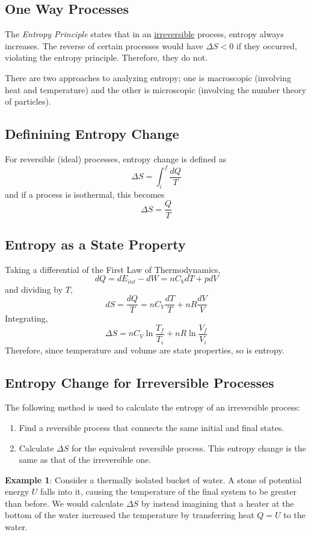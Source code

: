 \documentclass[../PhysicsFormulae.tex]{subfiles}
\begin{document}
\subsection{One Way Processes}
The \textit{Entropy Principle} states that in an \underline{irreversible} process, entropy always increases. The reverse of certain processes would have $\Delta S < 0$ if they occurred, violating the entropy principle. Therefore, they do not. \bigskip

There are two approaches to analyzing entropy; one is macroscopic (involving heat and temperature) and the other is microscopic (involving the number theory of particles). 

\subsection{Definining Entropy Change}
For reversible (ideal) processes, entropy change is defined as 
\[ \Delta S = \int_i^f \frac{dQ}{T} \]
and if a process is isothermal, this becomes
\[ \Delta S = \frac{Q}{T} \]

\subsection{Entropy as a State Property}
Taking a differential of the First Law of Thermodynamics, 
\[ dQ = dE_{int} - dW = n C_V dT + p dV \]
and dividing by $T$, 
\[ dS = \frac{dQ}{T} = n C_V \frac{dT}{T} + n R \frac{dV}{V} \] 
Integrating, 
\[ \Delta S = n C_V \ln{\frac{T_f}{T_i}} + n R \ln{\frac{V_f}{V_i}}  \]
Therefore, since temperature and volume are state properties, so is entropy.

\subsection{Entropy Change for Irreversible Processes}
The following method is used to calculate the entropy of an irreversible process: 
\begin{enumerate}
	\item Find a reversible process that connects the same initial and final states. 
	\item Calculate $\Delta S$ for the equivalent reversible process. This entropy change is the same as that of the irreversible one. 
\end{enumerate}
\textbf{Example 1}: Consider a thermally isolated bucket of water. A stone of potential energy $U$ falls into it, causing the temperature of the final system to be greater than before. We would calculate $\Delta S$ by instead imagining that a heater at the bottom of the water increased the temperature by transferring heat $Q = U$ to the water. \bigskip
\end{document}
